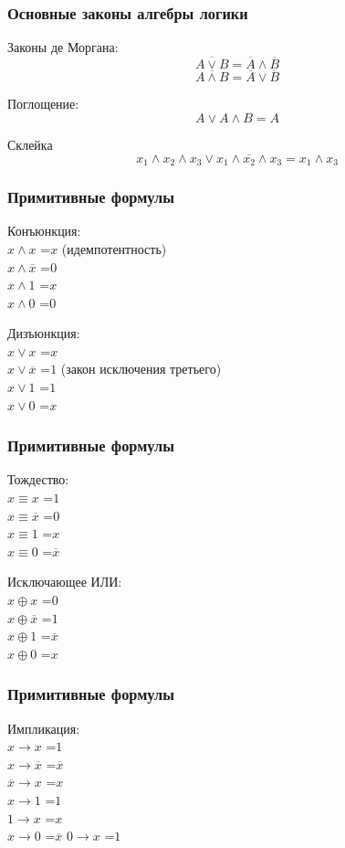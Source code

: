 \begin{frame}
\frametitle{Основные законы алгебры логики}
Законы де Моргана:
$$ \overline{A \vee B} = \overline{A} \wedge \overline{B} $$
$$ \overline{A \wedge B} = \overline{A} \vee \overline{B} $$ \pause

Поглощение:
$$ A \vee A\wedge B =A$$ \pause

Склейка
$$ x_1\wedge x_2 \wedge x_3 \vee x_1\wedge \overline{x_2} \wedge x_3 = x_1 \wedge x_3$$

\end{frame}

\begin{frame}
\frametitle{Примитивные формулы}
Конъюнкция:\\
$ x \wedge x$ =\pause $x$ (идемпотентность)\\
$ x \wedge \overline{x}$ =\pause $0$\\
$ x \wedge 1$ =\pause $x$\\
$ x \wedge 0$ =\pause $0$

Дизъюнкция:\\
$ x \vee x$ =\pause $x$\\
$ x \vee \overline{x}$ =\pause $1$ (закон исключения третьего)\\
$ x \vee 1$ =\pause $1$\\
$ x \vee 0$ =\pause $x$



\end{frame}

\begin{frame}
\frametitle{Примитивные формулы}
Тождество:\\
$ x \equiv x$ =\pause $1$ \\
$ x \equiv \overline{x}$ =\pause $0$\\
$ x \equiv 1$ =\pause $x$\\
$ x \equiv 0$ =\pause $\overline{x}$

Исключающее ИЛИ:\\
$ x \oplus x$ =\pause $0$\\
$ x \oplus \overline{x}$ =\pause $1$\\
$ x \oplus 1$ =\pause $\overline{x}$\\
$ x \oplus 0$ =\pause $x$



\end{frame}

\begin{frame}
\frametitle{Примитивные формулы}
Импликация:\\
$ x \rightarrow x$ =\pause $1$ \\
$ x \rightarrow \overline{x}$ =\pause $\overline{x}$\\
$ \overline{x} \rightarrow x $ =\pause $x$\\
$ x \rightarrow 1$ =\pause $1$\\
$ 1 \rightarrow x$ =\pause $x$\\
$ x \rightarrow 0$ =\pause $\overline{x}$
$ 0 \rightarrow x$ =\pause $1$

\end{frame}

